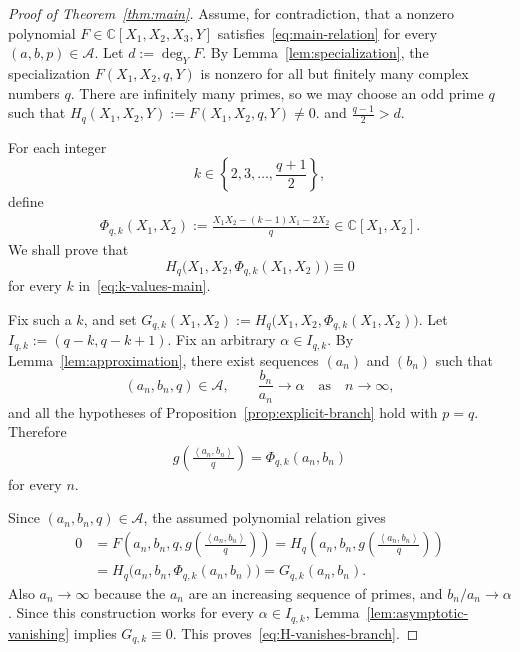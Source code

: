 \documentclass[reqno, 12pt]{article}
\numberwithin{equation}{section}
\theoremstyle{definition}
\newcommand{\CC}{\mathbb{C}}
\newcommand{\cA}{\mathcal{A}}
\newcommand{\gen}[1]{\left\langle #1\right\rangle}
\begin{document}
\begin{proof}[Proof of Theorem~\ref{thm:main}]
Assume, for contradiction, that a nonzero polynomial $F\in\CC[X_1,X_2,X_3,Y]$ satisfies~\cref{eq:main-relation} for every $(a,b,p)\in\cA$.  Let $d:=\deg_Y F$. By Lemma~\ref{lem:specialization}, the specialization
$F(X_1,X_2,q,Y)$ is nonzero for all but finitely many complex numbers $q$.
There are infinitely many primes, so we may choose an odd prime $q$ such that
$H_q(X_1,X_2,Y) :=F(X_1,X_2,q,Y)\neq 0$.
and $\frac{q-1}{2}>d$.

For each integer
\begin{equation}\label{eq:k-values-main}
  k\in\left\{2,3,\ldots,\frac{q+1}{2}\right\},
\end{equation}
define
\begin{align*}
\Phi_{q,k}(X_1,X_2):=\frac{X_1X_2-(k-1)X_1-2X_2}{q}\in\CC[X_1,X_2].
\end{align*}
We shall prove that
\begin{equation}\label{eq:H-vanishes-branch}
  H_q\bigl(X_1,X_2,\Phi_{q,k}(X_1,X_2)\bigr)\equiv0
\end{equation}
for every $k$ in~\cref{eq:k-values-main}.

Fix such a $k$, and set $G_{q,k}(X_1,X_2):=H_q\bigl(X_1,X_2,\Phi_{q,k}(X_1,X_2)\bigr)$.
Let $I_{q,k}:=(q-k,q-k+1)$.
Fix an arbitrary $\alpha\in I_{q,k}$.  By Lemma~\ref{lem:approximation}, there exist sequences $(a_n)$ and $(b_n)$ such
that
\[(a_n,b_n,q)\in\cA,\qquad\frac{b_n}{a_n}\longrightarrow\alpha\quad \text{as}\quad n\longrightarrow \infty,
\]
and all the hypotheses of Proposition~\ref{prop:explicit-branch} hold with
$p=q$.  Therefore
\begin{align*}
  g\!\left(\frac{\gen{a_n,b_n}}{q}\right) =\Phi_{q,k}(a_n,b_n)
\end{align*}
for every $n$.

Since $(a_n,b_n,q)\in\cA$, the assumed polynomial relation gives
\begin{align*}
0&=F\left(a_n,b_n,q,g\!\left(\frac{\gen{a_n,b_n}}{q}\right)\right)
=H_q\left(a_n,b_n,g\!\left(\frac{\gen{a_n,b_n}}{q}\right)\right)
\\& =H_q\bigl(a_n,b_n,\Phi_{q,k}(a_n,b_n)\bigr)
=G_{q,k}(a_n,b_n).
\end{align*}
Also $a_n\to\infty$ because the $a_n$ are an increasing sequence of primes,
and $b_n/a_n\to\alpha$.  Since this construction works for every
$\alpha\in I_{q,k}$, Lemma~\ref{lem:asymptotic-vanishing} implies $G_{q,k}\equiv0$.
This proves~\cref{eq:H-vanishes-branch}.


\end{proof}
\end{document}
